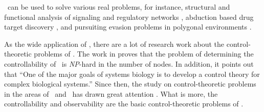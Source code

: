 \BCNs\ can be used to solve various real problems, for instance, %
structural and functional analysis of signaling and regulatory networks \cite{Kaufman1999A, Klamt2006A}, 
abduction based drug target discovery \cite{Biane2017Abduction}, %
and pursuiting evasion problems in polygonal environments \cite{Thunberg2011A}. 





      

As the wide application of \BCNs, there are a lot of research work about the control-theoretic problems of \BCNs. The work in \cite{Akutsu2007Control} proves that the problem of determining the controllability of \BCNs\ is {\em NP}-hard in the number of nodes. In addition, it points out that ``One of the major goals of systems biology is to develop a control theory for complex biological systems.'' Since then, the study on control-theoretic problems in the areas of \BNs\ and \BCNs\ has drawn great attention \cite{cheng2009controllability, Zhao2010Input, Cheng2011Identification, Cheng2011Analysis,Fornasini2013Observability}. What is more, the controllability and observability are the basic control-theoretic problems of \BCNs. %

